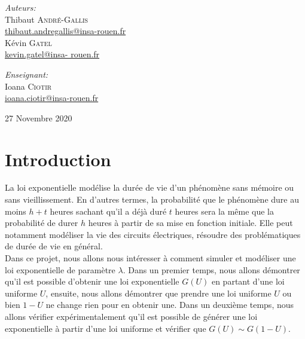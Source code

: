 \documentclass[12,french]{report}
\begin{document}
\begin{titlepage}
\begin{center}
	\begin{minipage}{0.4\textwidth}
		\begin{flushleft} \large
			\emph{Auteurs:}\\
			Thibaut \textsc{André-Gallis} \\
			{\small\href{mailto:thibaut.andregallis@insa-rouen.fr}{thibaut.andregallis@insa-rouen.fr}} \\
			Kévin \textsc{Gatel} \\
			{\small\href{mailto:kevin.gatel@insa-rouen.fr}{kevin.gatel@insa-				rouen.fr}}
		\end{flushleft}
	\end{minipage}
	\begin{minipage}{0.4\textwidth}
		\begin{flushright} \large
			\emph{Enseignant:} \\
			Ioana \textsc{Ciotir} \\
			{\small\href{mailto:ioana.ciotir@insa-rouen.fr}								{ioana.ciotir@insa-rouen.fr}}
		\end{flushright}
	\end{minipage}

	\vfill
	{\large 27 Novembre 2020}
\end{center}
\end{titlepage}

\tableofcontents


\renewcommand{\chaptername}{}
\chapter*{Introduction}

La loi exponentielle modélise la durée de vie d'un phénomène sans mémoire ou sans vieillissement. En d'autres termes, la probabilité que le phénomène dure au moins $h+t$ heures sachant qu'il a déjà duré $t$ heures sera la même que la probabilité de durer $h$ heures à partir de sa mise en fonction initiale. Elle peut notamment modéliser la vie des circuits électriques, résoudre des problématiques de durée de vie en général.\\

Dans ce projet, nous allons nous intéresser à comment simuler et modéliser une loi exponentielle de paramètre $\lambda$. Dans un premier temps, nous allons démontrer qu'il est possible d'obtenir une loi exponentielle $G(U)$ en partant d'une loi uniforme $U$, ensuite, nous allons démontrer que prendre une loi uniforme $U$ ou bien $1-U$ ne change rien pour en obtenir une. Dans un deuxième temps, nous allons vérifier expérimentalement qu'il est possible de générer une loi exponentielle à partir d'une loi uniforme et vérifier que $G(U) \sim G(1-U)$.
\end{document}
